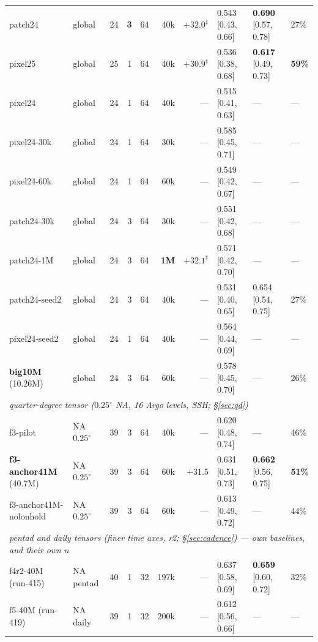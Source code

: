 \documentclass[10pt]{article}
\begin{document}
\begin{table}[p]
\begin{tabular}{llrrrrrlll}
patch24         & global & 24 & \textbf{3} & 64 & 40k & $+32.0^\ddagger$ & 0.543 [0.43, 0.66] & \textbf{0.690} [0.57, 0.78] & 27\% \\
pixel25         & global & 25 & 1 & 64 & 40k & $+30.9^\ddagger$ & 0.536 [0.38, 0.68] & \textbf{0.617} [0.49, 0.73] & \textbf{59\%} \\
pixel24         & global & 24 & 1 & 64 & 40k & --- & 0.515 [0.41, 0.63] & ---                  & --- \\
pixel24-30k     & global & 24 & 1 & 64 & 30k & --- & 0.585 [0.45, 0.71] & ---                  & --- \\
pixel24-60k     & global & 24 & 1 & 64 & 60k & --- & 0.549 [0.42, 0.67] & ---                  & --- \\
patch24-30k     & global & 24 & 3 & 64 & 30k & --- & 0.551 [0.42, 0.68] & ---                  & --- \\
patch24-1M      & global & 24 & 3 & 64 & \textbf{1M} & $+32.1^\ddagger$ & 0.571 [0.42, 0.70] & --- & --- \\
patch24-seed2   & global & 24 & 3 & 64 & 40k & --- & 0.531 [0.40, 0.65] & 0.654 [0.54, 0.75] & 27\% \\
pixel24-seed2   & global & 24 & 1 & 64 & 40k & --- & 0.564 [0.44, 0.69] & ---                  & --- \\
\textbf{big10M} (10.26M) & global & 24 & 3 & 64 & 60k & --- & 0.578 [0.45, 0.70] & --- & 26\% \\
\midrule
\multicolumn{10}{l}{\emph{quarter-degree tensor ($0.25^\circ$ NA, 16 Argo levels, SSH; \S\ref{sec:qd})}}\\
f3-pilot        & NA $0.25^\circ$ & 39 & 3 & 64 & 40k & --- & 0.620 [0.48, 0.74] & ---   & 46\% \\
\textbf{f3-anchor41M} (40.7M) & NA $0.25^\circ$ & 39 & 3 & 64 & 60k & $+31.5$ & 0.631 [0.51, 0.73] & \textbf{0.662} [0.56, 0.75] & \textbf{51\%} \\
f3-anchor41M-nolonhold & NA $0.25^\circ$ & 39 & 3 & 64 & 60k & --- & 0.613 [0.49, 0.72] & ---  & 44\% \\
\midrule
\multicolumn{10}{l}{\emph{pentad and daily tensors (finer time axes, r2;
\S\ref{sec:cadence}) --- own baselines, and their own $n$}}\\
f4r2-40M (run-415) & NA pentad & 40 & 1 & 32 & 197k & --- & 0.637 [0.58, 0.69] & \textbf{0.659} [0.60, 0.72] & 32\% \\
f5-40M (run-419) & NA daily & 39 & 1 & 32 & 200k & --- & 0.612 [0.56, 0.66] & ---     & --- \\

\end{tabular}
\end{table}
\end{document}
